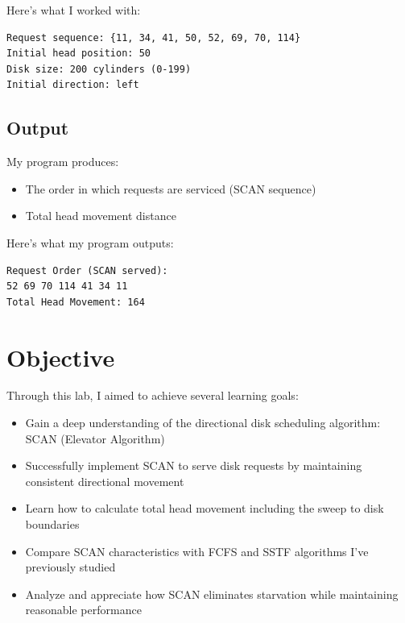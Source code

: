 \documentclass[12pt,a4paper]{article}
\begin{document}
Here's what I worked with:
\begin{verbatim}
Request sequence: {11, 34, 41, 50, 52, 69, 70, 114}
Initial head position: 50
Disk size: 200 cylinders (0-199)
Initial direction: left
\end{verbatim}

\subsection*{Output}
My program produces:
\begin{itemize}
  \item The order in which requests are serviced (SCAN sequence)
  \item Total head movement distance
\end{itemize}

Here's what my program outputs:
\begin{verbatim}
Request Order (SCAN served):
52 69 70 114 41 34 11
Total Head Movement: 164
\end{verbatim}

\section{Objective}
Through this lab, I aimed to achieve several learning goals:
\begin{itemize}
    \item Gain a deep understanding of the directional disk scheduling algorithm: SCAN (Elevator Algorithm)
    \item Successfully implement SCAN to serve disk requests by maintaining consistent directional movement
    \item Learn how to calculate total head movement including the sweep to disk boundaries
    \item Compare SCAN characteristics with FCFS and SSTF algorithms I've previously studied
    \item Analyze and appreciate how SCAN eliminates starvation while maintaining reasonable performance
\end{itemize}
\end{document}
